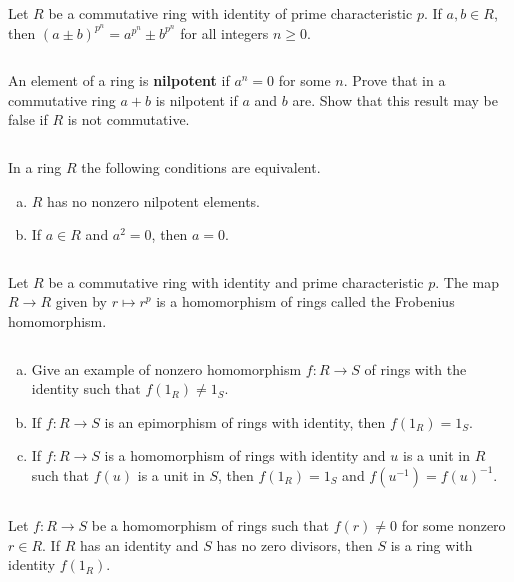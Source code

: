$$ $$

\begin{ex}
    Let $R$ be a commutative ring with identity of prime characteristic $p$. If $a, b\in R$, then $(a\pm b)^{p^{n}}=a^{p^{n}}\pm b^{p^{n}}$ for all integers $n\geq 0$.
\end{ex}

$$ $$

\begin{ex}
    An element of a ring is \textbf{nilpotent} if $a^{n}=0$ for some $n$. Prove that in a commutative ring $a+b$ is nilpotent if $a$ and $b$ are. Show that this result may be false if $R$ is not commutative.
\end{ex}

$$ $$

\begin{ex}
    In a ring $R$ the following conditions are equivalent.
    \begin{enumerate}[(a)]
        \item $R$ has no nonzero nilpotent elements.
        \item If $a\in R$ and $a^{2}=0$, then $a=0$.
    \end{enumerate}
\end{ex}

$$ $$

\begin{ex}
    Let $R$ be a commutative ring with identity and prime characteristic $p$. The map $R\to R$ given by $r\mapsto r^{p}$ is a homomorphism of rings called the Frobenius homomorphism.
\end{ex}

$$ $$

\begin{ex}
    \begin{enumerate}[(a)]
        \item Give an example of nonzero homomorphism $f:R\to S$ of rings with the identity such that $f(1_{R})\neq 1_{S}$.
        \item If $f:R\to S$ is an epimorphism of rings with identity, then $f(1_{R})=1_{S}$.
        \item If $f:R\to S$ is a homomorphism of rings with identity and $u$ is a unit in $R$ such that $f(u)$ is a unit in $S$, then $f(1_{R})=1_{S}$ and $f(u^{-1})=f(u)^{-1}$.
    \end{enumerate}
\end{ex}

$$ $$

\begin{ex}
    Let $f:R\to S$ be a homomorphism of rings such that $f(r)\neq 0$ for some nonzero $r\in R$. If $R$ has an identity and $S$ has no zero divisors, then $S$ is a ring with identity $f(1_{R})$.
\end{ex}

